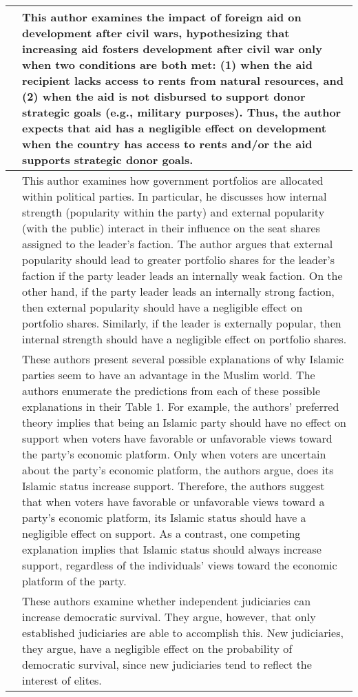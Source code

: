 \documentclass[12pt]{article}
\begin{document}
\begin{center}
\begin{longtable}{p{5cm} p{10cm}}
\hline 
\cite{Girod2012} & This author examines the impact of foreign aid on development after civil wars, hypothesizing that increasing aid fosters development after civil war only when two conditions are both met: (1) when the aid recipient lacks access to rents from natural resources, and (2) when the aid is not disbursed to support donor strategic goals (e.g., military purposes). Thus, the author expects that aid has a negligible effect on development when the country has access to rents and/or the aid supports strategic donor goals.\\ 
\hline 
\cite{Ono2012} & This author examines how government portfolios are allocated within political parties. In particular, he discusses how internal strength (popularity within the party) and external popularity (with the public) interact in their influence on the seat shares assigned to the leader's faction. The author argues that external popularity should lead to greater portfolio shares for the leader's faction if the party leader leads an internally weak faction. On the other hand, if the party leader leads an internally strong faction, then external popularity should have a negligible effect on portfolio shares. Similarly, if the leader is externally popular, then internal strength should have a negligible effect on portfolio shares. \\ 
\hline 
\cite{Pepinsky2012} & These authors present several possible explanations of why Islamic parties seem to have an advantage in the Muslim world. The authors enumerate the predictions from each of these possible explanations in their Table 1. For example, the authors' preferred theory implies that being an Islamic party should have no effect on support when voters have favorable or unfavorable views toward the party's economic platform. Only when voters are uncertain about the party's economic platform, the authors argue, does its Islamic status increase support. Therefore, the authors suggest that when voters have favorable or unfavorable views toward a party's economic platform, its Islamic status should have a negligible effect on support. As a contrast, one competing explanation implies that Islamic status should always increase support, regardless of the individuals' views toward the economic platform of the party.\\ 
\hline 
\cite{Gibler2011} & These authors examine whether independent judiciaries can increase democratic survival. They argue, however, that only established judiciaries are able to accomplish this. New judiciaries, they argue, have a negligible effect on the probability of democratic survival, since new judiciaries tend to reflect the interest of elites.\\ 

\end{longtable}
\end{center}
\end{document}
